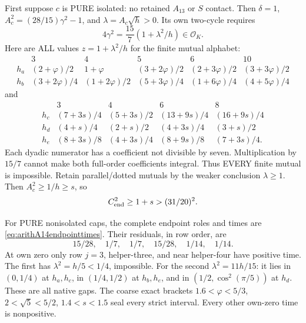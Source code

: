 \documentclass[11pt]{article}
\begin{document}
First suppose \(c\) is PURE isolated:
no retained \(A_{13}\) or \(S\) contact.
Then \(\delta=1\),
\(A_c^2=(28/15)\gamma^2-1\),
and \(\lambda=A_c\sqrt h>0\).
Its own two-cycle requires
\[
                    4\gamma^2={\frac{15}{7}}(1+\lambda^2/h)
                                     \in\mathcal O_K .
\]
Here are ALL values \(z=1+\lambda^2/h\)
for the finite mutual alphabet:
\[
 \begin{array}{c|ccccc}
 &3&4&5&6&10\\ \hline
 h_a&(2+\varphi)/2&1+\varphi&(3+2\varphi)/2&
                    (2+3\varphi)/2&(3+3\varphi)/2\\
 h_b&(3+2\varphi)/4&(1+2\varphi)/2&(5+3\varphi)/4&
                    (1+6\varphi)/4&(4+5\varphi)/4
 \end{array}
\]
and
\[
 \begin{array}{c|cccc}
 &3&4&6&8\\ \hline
 h_c&(7+3s)/4&(5+3s)/2&(13+9s)/4&(16+9s)/4\\
 h_d&(4+s)/4&(2+s)/2&(4+3s)/4&(3+s)/2\\
 h_e&(8+3s)/8&(4+3s)/4&(8+9s)/8&(7+3s)/4 .
 \end{array}
\]
Each dyadic numerator has a coefficient
not divisible by seven.
Multiplication by \(15/7\) cannot make
both full-order coefficients integral.
Thus EVERY finite mutual is impossible.
Retain parallel/dotted mutuals by the
weaker conclusion \(\lambda\ge1\).
Then \(A_c^2\ge1/h\ge s\), so
\[
                  C_{\rm end}^2\ge1+s>(31/20)^2 .
\]

For PURE nonisolated caps, the complete
endpoint roles and times are
\eqref{eq:arithA14endpointtimes}.
Their residuals, in row order, are
\[
                         15/28,\quad1/7,\quad1/7,\quad15/28,
                                      \quad1/14,\quad1/14 .
\]
At own zero only row \(j=3\), helper-three,
and near helper-four have positive time.
The first has \(\lambda^2=h/5<1/4\),
impossible.
For the second \(\lambda^2=11h/15\):
it lies in \((0,1/4)\) at \(h_a,h_c\),
in \((1/4,1/2)\) at \(h_b,h_e\),
and in \((1/2,\cos^2(\pi/5))\) at \(h_d\).
These are all native gaps.
The coarse exact brackets
\(1.6<\varphi<5/3\),
\(2<\sqrt5<5/2\), \(1.4<s<1.5\)
seal every strict interval.
Every other own-zero time is nonpositive.
\end{document}
